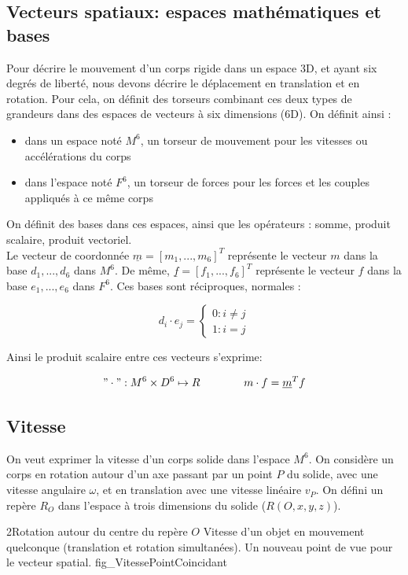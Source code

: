 \documentclass{report}
\begin{document}
\subsection{Vecteurs spatiaux: espaces mathématiques et bases}

Pour décrire le mouvement d'un corps rigide dans un espace 3D, et ayant six degrés de liberté, nous devons décrire le déplacement en translation et en rotation. Pour cela, on définit des torseurs combinant ces deux types de grandeurs dans des espaces de vecteurs à six dimensions (6D). On définit ainsi :\\
\begin{itemize}
\item dans un espace noté $M^{6}$, un torseur de mouvement pour les vitesses ou accélérations du corps
\item dans l'espace noté $F^{6}$, un torseur de forces pour les forces et les couples appliqués à ce même corps
\end{itemize}
On définit des bases dans ces espaces, ainsi que les opérateurs : somme, produit scalaire, produit vectoriel.\\
Le vecteur de coordonnée $\underline{m}=[m_{1},...,m_{6}]^T$ représente le vecteur $m$ dans la base ${d_{1},...,d_{6}}$ dans $M^{6}$.
De même, $\underline{f}=[f_{1},...,f_{6}]^T$ représente le vecteur $f$ dans la base ${e_{1},...,e_{6}}$ dans $F^{6}$.
Ces bases sont réciproques, normales :

$$
d_{i}\cdot e_{j}=
\begin{cases}
0 \colon i \neq j\\
1 \colon i = j
\end{cases}
$$

Ainsi le produit scalaire entre ces vecteurs s'exprime:

$$
"\cdot" : M^{6} \times D^{6} \mapsto R
\qquad
\qquad
m \cdot f = \underline{m}^T f
$$

\subsection{Vitesse}\label{ch_algSpa_Vitesse}

On veut exprimer la vitesse d'un corps solide dans l'espace $M^{6}$. On considère un corps en rotation autour d'un axe passant par un point $P$ du solide, avec une vitesse angulaire $\omega$, et en translation avec une vitesse linéaire $v_{P}$. On défini un repère $R_{O}$ dans l'espace à trois dimensions du solide ($R(O,x,y,z)$).

{2}{Rotation autour du centre du repère $O$}
{Vitesse d'un objet en mouvement quelconque (translation et rotation simultanées). Un nouveau point de vue pour le vecteur spatial.}
{fig_VitessePointCoincidant}
\end{document}
